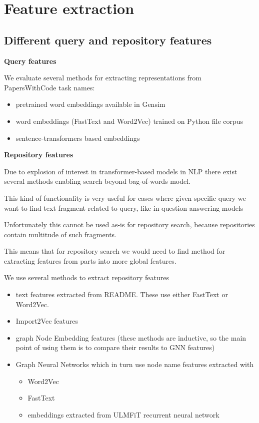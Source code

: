 \documentclass[11pt]{report}
\begin{document}
\section{Feature extraction}
\label{approach_feature_extraction}

\subsection{Different query and repository features}

\textbf{Query features}


We evaluate several methods for extracting representations from PapersWithCode task names:
\begin{itemize}
\item pretrained word embeddings available in Gensim \cite{rehurek2011gensim}
\item word embeddings (FastText and Word2Vec) trained on Python file corpus
\item sentence-transformers based embeddings \cite{sentence_transformers}
\end{itemize}

\textbf{Repository features}

Due to explosion of interest in transformer-based models in NLP there exist several methods enabling search beyond bag-of-words model.

This kind of functionality is very useful for cases where given specific query we want to find text fragment related to query, like in question answering models

Unfortunately this cannot be used as-is for repository search, because repositories contain multitude of such fragments.

This means that for repository search we would need to find method  for extracting features from parts into more global features.

We use several methods to extract repository features
\begin{itemize}
    \item text features extracted from README. These use either FastText or Word2Vec.
    \item Import2Vec features
    \item graph Node Embedding features (these methods are inductive, so the main point of using them is to compare their results to GNN features)
    \item Graph Neural Networks which in turn use node name features extracted with 
      \begin{itemize}
        \item Word2Vec
        \item FastText
        \item {\color{red} embeddings extracted from ULMFiT recurrent neural network \cite{ulmfit}}
      \end{itemize}
\end{itemize}
\end{document}

